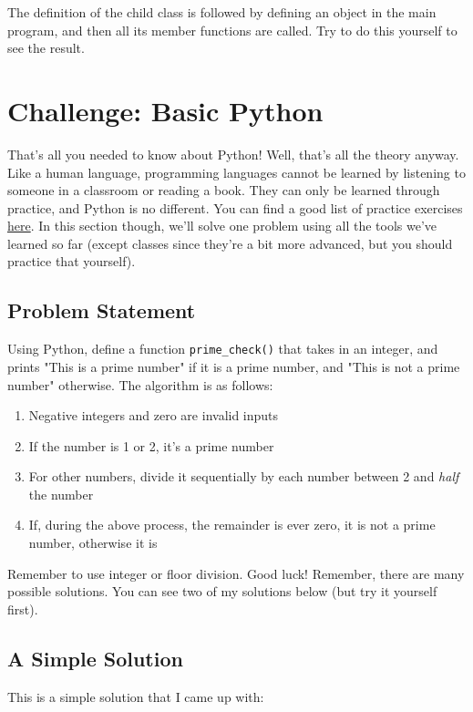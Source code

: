 \documentclass[12pt]{article}
\newcommand{\code}{\texttt}
\begin{document}
The definition  of the child class is followed by defining an object in the main program, and then all its member functions are called. Try to do this yourself to see the result.

\newpage
\section{Challenge: Basic Python}
That's all you needed to know about Python! Well, that's all the theory anyway. Like a human language, programming languages cannot be learned by listening to someone in a classroom or reading a book. They can only be learned through practice, and Python is no different. You can find a good list of practice exercises \href{https://www.practicepython.org/}{here}. In this section though, we'll solve one problem using all the tools we've learned so far (except classes since they're a bit more advanced, but you should practice that yourself).

\subsection{Problem Statement}
Using Python, define a function \code{prime\_check()} that takes in an integer, and prints "This is a prime number" if it is a prime number, and "This is not a prime number" otherwise. The algorithm is as follows:

\begin{enumerate}
	\item Negative integers and zero are invalid inputs
	\item If the number is 1 or 2, it's a prime number
	\item For other numbers, divide it sequentially by each number between 2 and \textit{half} the number
	\item If, during the above process, the remainder is ever zero, it is not a prime number, otherwise it is
\end{enumerate}

Remember to use integer or floor division. Good luck! Remember, there are many possible solutions. You can see two of my solutions below (but try it yourself first).

\subsection{A Simple Solution}
This is a simple solution that I came up with:
\end{document}
